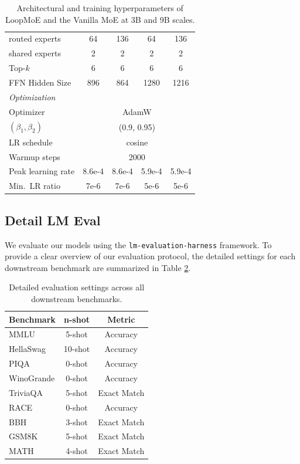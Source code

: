 \begin{table}[h]
\begin{tabular}{lcccc}
\midrule
routed experts                   & 64   & 136  & 64& 136\\
shared experts                   & 2    & 2    & 2& 2\\
Top-$k$                          & 6    & 6    & 6& 6\\
FFN Hidden Size                  & 896  & 864  & 1280& 1216\\
\midrule
\multicolumn{5}{l}{\emph{Optimization}} \\
\midrule
Optimizer                        & \multicolumn{4}{c}{AdamW} \\
$(\beta_1, \beta_2)$             & \multicolumn{4}{c}{(0.9, 0.95)} \\
LR schedule                      & \multicolumn{4}{c}{cosine} \\
Warmup steps                     & \multicolumn{4}{c}{2000} \\
Peak learning rate               & 8.6e-4 & 8.6e-4 & 5.9e-4 & 5.9e-4 \\
Min.\ LR ratio                   & 7e-6 & 7e-6 & 5e-6 & 5e-6\\
\bottomrule
\end{tabular}
\caption{Architectural and training hyperparameters of LoopMoE and the Vanilla MoE at 3B and 9B scales.}
\label{tab:hyperparams}
\end{table}


\subsection{Detail LM Eval}
We evaluate our models using the \texttt{lm-evaluation-harness} framework. To provide a clear overview of our evaluation protocol, the detailed settings for each downstream benchmark are summarized in Table \ref{tab:eval_details}.

\label{app:lm_eval}
\begin{table}[h]
\centering
\small
\begin{tabular}{lcc}
\toprule
\textbf{Benchmark} & \textbf{n-shot} & \textbf{Metric} \\
\midrule
MMLU       & 5-shot & Accuracy \\
HellaSwag  & 10-shot & Accuracy \\
PIQA       & 0-shot & Accuracy \\
WinoGrande & 0-shot & Accuracy \\
TriviaQA   & 5-shot & Exact Match \\
RACE       & 0-shot & Accuracy \\
BBH        & 3-shot & Exact Match \\
GSM8K      & 5-shot & Exact Match \\
MATH       & 4-shot & Exact Match \\
\bottomrule
\end{tabular}
\caption{Detailed evaluation settings across all downstream benchmarks.}
\label{tab:eval_details}
\end{table}

